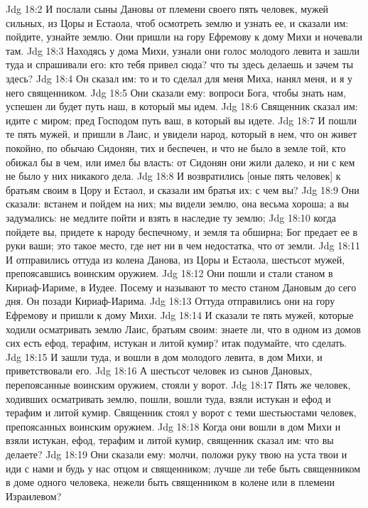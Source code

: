 \vs Jdg 18:2 И послали сыны Дановы от племени своего пять человек, мужей сильных, из Цоры и Естаола, чтоб осмотреть землю и узнать ее, и сказали им: пойдите, узнайте землю. Они пришли на гору Ефремову к дому Михи и ночевали там.
\vs Jdg 18:3 Находясь у дома Михи, узнали они голос молодого левита и зашли туда и спрашивали его: кто тебя привел сюда? что ты здесь делаешь и зачем ты здесь?
\vs Jdg 18:4 Он сказал им: то и то сделал для меня Миха, нанял меня, и я у него священником.
\vs Jdg 18:5 Они сказали ему: вопроси Бога, чтобы знать нам, успешен ли будет путь наш, в который мы идем.
\vs Jdg 18:6 Священник сказал им: идите с миром; пред Господом путь ваш, в который вы идете.
\vs Jdg 18:7 И пошли те пять мужей, и пришли в Лаис, и увидели народ, который в нем, что он живет покойно, по обычаю Сидонян, тих и беспечен, и что не было в земле той, кто обижал бы в чем, или имел бы власть: от Сидонян они жили далеко, и ни с кем не было у них никакого дела.
\vs Jdg 18:8 И возвратились [оные пять человек] к братьям своим в Цору и Естаол, и сказали им братья их: с чем вы?
\vs Jdg 18:9 Они сказали: встанем и пойдем на них; мы видели землю, она весьма хороша; а вы задумались: не медлите пойти и взять в наследие ту землю;
\vs Jdg 18:10 когда пойдете вы, придете к народу беспечному, и земля та обширна; Бог предает ее в руки ваши; это такое место, где нет ни в чем недостатка, что  от земли.
\vs Jdg 18:11 И отправились оттуда из колена Данова, из Цоры и Естаола, шестьсот мужей, препоясавшись воинским оружием.
\vs Jdg 18:12 Они пошли и стали станом в Кириаф-Иариме, в Иудее. Посему и называют то место станом Дановым до сего дня. Он позади Кириаф-Иарима.
\vs Jdg 18:13 Оттуда отправились они на гору Ефремову и пришли к дому Михи.
\vs Jdg 18:14 И сказали те пять мужей, которые ходили осматривать землю Лаис, братьям своим: знаете ли, что в одном из домов сих есть ефод, терафим, истукан и литой кумир? итак подумайте, что сделать.
\vs Jdg 18:15 И зашли туда, и вошли в дом молодого левита, в дом Михи, и приветствовали его.
\vs Jdg 18:16 А шестьсот человек из сынов Дановых, перепоясанные воинским оружием, стояли у ворот.
\vs Jdg 18:17 Пять же человек, ходивших осматривать землю, пошли, вошли туда, взяли истукан и ефод и терафим и литой кумир. Священник стоял у ворот с теми шестьюстами человек, препоясанных воинским оружием.
\vs Jdg 18:18 Когда они вошли в дом Михи и взяли истукан, ефод, терафим и литой кумир, священник сказал им: что вы делаете?
\vs Jdg 18:19 Они сказали ему: молчи, положи руку твою на уста твои и иди с нами и будь у нас отцом и священником; лучше ли тебе быть священником в доме одного человека, нежели быть священником в колене или в племени Израилевом?

